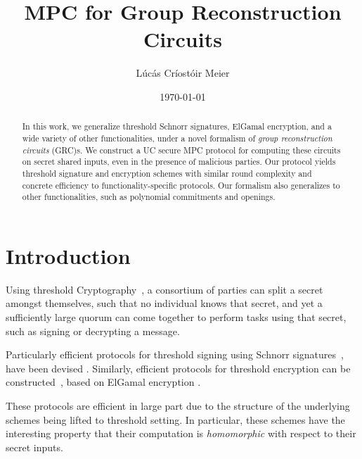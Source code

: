

\date{\today}
\title{MPC for Group Reconstruction Circuits}
\author{Lúcás Críostóir Meier}



\maketitle

\begin{abstract}
    In this work, we generalize threshold Schnorr signatures,
    ElGamal encryption, and a wide variety of other functionalities,
    under a novel formalism of \emph{group reconstruction circuits} (GRC)s.
    We construct a UC secure MPC protocol for computing these circuits
    on secret shared inputs, even in the presence of malicious parties.
    Our protocol yields threshold signature and encryption schemes
    with similar round complexity and concrete efficiency to
    functionality-specific protocols.
    Our formalism also generalizes to other functionalities,
    such as polynomial commitments and openings.
\end{abstract}

\section{Introduction}

Using threshold Cryptography~\cite{desmedt_society_1988,desmedt_threshold_1990},
a consortium of parties can split
a secret amongst themselves, such that no individual knows that
secret, and yet a sufficiently large quorum can come together
to perform tasks using that secret, such as signing
or decrypting a message.

Particularly efficient protocols for threshold signing
using Schnorr signatures~\cite{schnorr_efficient_1990},
have been devised
\cite{komlo_frost_2020, nick_musig2_2021, lindell_simple_2022}.
Similarly, efficient protocols for threshold
encryption can be constructed~\cite{desmedt_threshold_1990, shoup_securing_2001},
based on ElGamal encryption \cite{elgamal_public_1985}.

These protocols are efficient in large part due to the structure
of the underlying schemes being lifted to threshold setting.
In particular, these schemes have the interesting property
that their computation is \emph{homomorphic} with respect
to their secret inputs.

